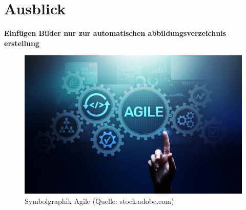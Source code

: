 \section{Ausblick}

\newpage
\listoffigures
\textbf{Einfügen Bilder nur zur automatischen abbildungsverzeichnis erstellung}
\begin{figure}[htb]
	\centering
	\includegraphics[width=\textwidth]{img/agile_symbol.jpg}
	\caption[Symbolgraphik Agile (Quelle: stock.adobe.com)]{Symbolgraphik Agile (Quelle: stock.adobe.com)}
	\label{fig:agile}
\end{figure}